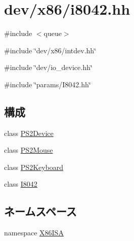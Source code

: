 \hypertarget{i8042_8hh}{
\section{dev/x86/i8042.hh}
\label{i8042_8hh}
}
{\ttfamily \#include $<$queue$>$}\par
{\ttfamily \#include \char`\"{}dev/x86/intdev.hh\char`\"{}}\par
{\ttfamily \#include \char`\"{}dev/io\_\-device.hh\char`\"{}}\par
{\ttfamily \#include \char`\"{}params/I8042.hh\char`\"{}}\par
\subsection*{構成}
\begin{DoxyCompactItemize}
\item 
class \hyperlink{classX86ISA_1_1PS2Device}{PS2Device}
\item 
class \hyperlink{classX86ISA_1_1PS2Mouse}{PS2Mouse}
\item 
class \hyperlink{classX86ISA_1_1PS2Keyboard}{PS2Keyboard}
\item 
class \hyperlink{classX86ISA_1_1I8042}{I8042}
\end{DoxyCompactItemize}
\subsection*{ネームスペース}
\begin{DoxyCompactItemize}
\item 
namespace \hyperlink{namespaceX86ISA}{X86ISA}
\end{DoxyCompactItemize}
